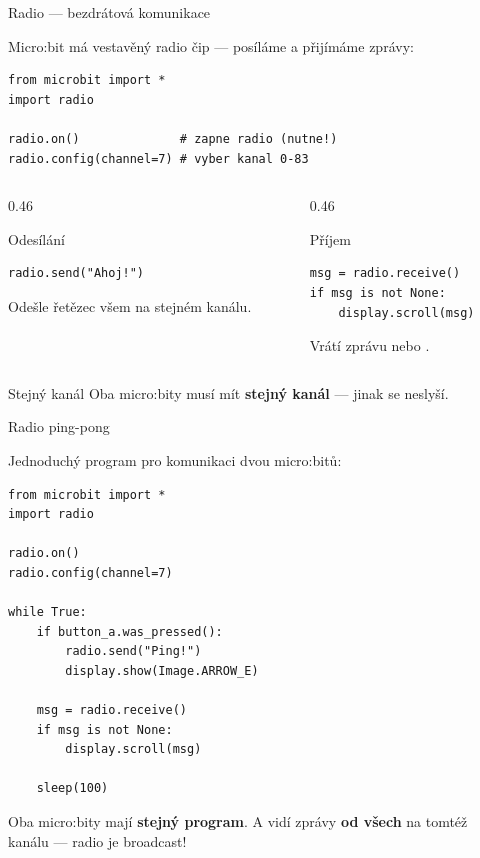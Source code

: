 \begin{frame}[fragile]{Radio — bezdrátová komunikace}

  Micro:bit má vestavěný radio čip — posíláme a přijímáme zprávy:

  \bigskip
  \begin{lstlisting}
from microbit import *
import radio

radio.on()              # zapne radio (nutne!)
radio.config(channel=7) # vyber kanal 0-83
  \end{lstlisting}

  \bigskip
  \begin{columns}[T]
    \begin{column}{0.46\textwidth}
      \begin{block}{Odesílání}
        \begin{lstlisting}
radio.send("Ahoj!")
        \end{lstlisting}
        Odešle řetězec všem na stejném kanálu.
      \end{block}
    \end{column}
    \begin{column}{0.46\textwidth}
      \begin{block}{Příjem}
        \begin{lstlisting}
msg = radio.receive()
if msg is not None:
    display.scroll(msg)
        \end{lstlisting}
        Vrátí zprávu nebo .
      \end{block}
    \end{column}
  \end{columns}

  \pause\bigskip
  \begin{alertblock}{Stejný kanál}
    Oba micro:bity musí mít \textbf{stejný kanál} — jinak se neslyší.
  \end{alertblock}
\end{frame}

\begin{frame}[fragile]{Radio ping-pong}

  Jednoduchý program pro komunikaci dvou micro:bitů:

  \bigskip
  \begin{lstlisting}
from microbit import *
import radio

radio.on()
radio.config(channel=7)

while True:
    if button_a.was_pressed():
        radio.send("Ping!")
        display.show(Image.ARROW_E)

    msg = radio.receive()
    if msg is not None:
        display.scroll(msg)

    sleep(100)
  \end{lstlisting}

  \bigskip
  Oba micro:bity mají \textbf{stejný program}.
  A vidí zprávy \textbf{od všech} na tomtéž kanálu — radio je broadcast!
\end{frame}

